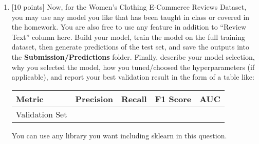 \documentclass[letterpaper]{article}
\begin{document}
\begin{enumerate}
\item {[10 points]} 
Now, for the Women's Clothing E-Commerce Reviews Dataset, you may use any model you like that has been taught in class or covered in the homework. You are also free to use any feature in addition to ``Review Text'' column here. Build your model, train the model on the full training dataset, then generate predictions of the test set, and save the outputs into the \textbf{Submission/Predictions} folder. Finally, describe your model selection, why you selected the model, how you tuned/choosed the hyperparameters (if applicable), and report your best validation result in the form of a table like:\\
\begin{table}[h!]
\center
\begin{tabular}{|l|c|c|c|c|}\hline
Metric       & Precision & Recall & F1 Score & AUC \\\hline
Validation Set &           &        &          &     \\\hline
\end{tabular}
\end{table}
You can use any library you want including sklearn in this question.
\end{enumerate}
\end{document}
